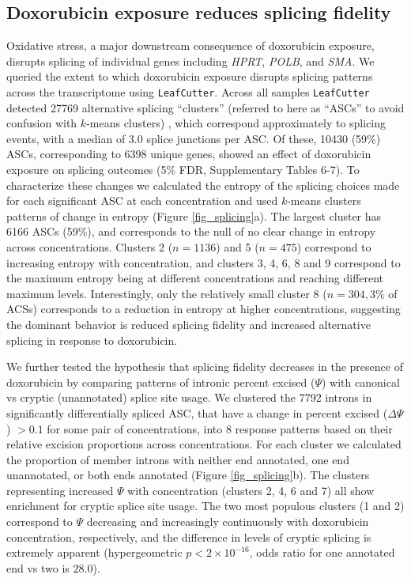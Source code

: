 \documentclass{article}
\begin{document}
\subsection*{Doxorubicin exposure reduces splicing fidelity}


Oxidative stress, a major downstream consequence of doxorubicin exposure, disrupts splicing of individual genes including \emph{HPRT}, \emph{POLB}\cite{Disher2007}, and \emph{SMA}\cite{Seo2016}. We queried the extent to which doxorubicin exposure disrupts splicing patterns across the transcriptome using \texttt{LeafCutter}\cite{LeafCutter}. Across all samples \texttt{LeafCutter} detected 27769 alternative splicing ``clusters'' (referred to here as ``ASCs'' to avoid confusion with $k$-means clusters) , which correspond approximately to splicing events, with a median of 3.0 splice junctions per ASC. Of these, 10430 (59\%) ASCs, corresponding to 6398 unique genes, showed an effect of doxorubicin exposure on splicing outcomes (5\% FDR, Supplementary Tables 6-7). To characterize these changes we calculated the entropy of the splicing choices made for each significant ASC at each concentration and used $k$-means clusters patterns of change in entropy (Figure \ref{fig_splicing}a). The largest cluster has 6166 ASCs (59\%), and corresponds to the null of no clear change in entropy across concentrations. Clusters 2 ($n=1136$) and 5 ($n=475$) correspond to increasing entropy with concentration, and clusters 3, 4, 6, 8 and 9 correspond to the maximum entropy being at different concentrations and reaching different maximum levels. Interestingly, only the relatively small cluster 8 ($n=304, 3\%$ of ACSs) corresponds to a reduction in entropy at higher  concentrations, suggesting the dominant behavior is reduced splicing fidelity and increased alternative splicing in response to doxorubicin. 

We further tested the hypothesis that splicing fidelity decreases in the presence of doxorubicin by comparing patterns of intronic percent excised ($\Psi$) with canonical vs cryptic (unannotated) splice site usage. We clustered the 7792 introns in significantly differentially spliced ASC, that have a change in percent excised ($\Delta \Psi$) $ > 0.1$ for some pair of concentrations, into 8 response patterns based on their relative excision proportions across concentrations. For each cluster we calculated the proportion of member introns with neither end annotated, one end unannotated, or both ends annotated (Figure \ref{fig_splicing}b). The clusters representing increased $\Psi$ with concentration (clusters 2, 4, 6 and 7) all show enrichment for cryptic splice site usage. The two most populous clusters (1 and 2) correspond to $\Psi$ decreasing and increasingly continuously with doxorubicin concentration, respectively, and the difference in levels of cryptic splicing is extremely apparent (hypergeometric $p < 2 \times 10^{-16}$, odds ratio for one annotated end vs two is $28.0$).
\end{document}
